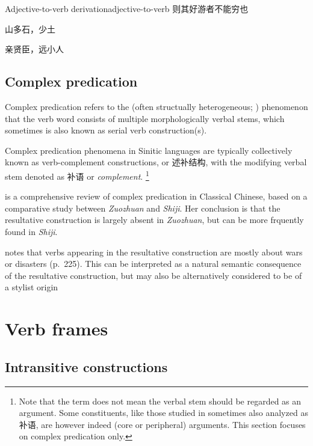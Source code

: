 \documentclass[UTF8, a4paper, oneside, scheme=plain, 12pt]{ctexrep}
\newcommand*{\citepage}[1]{p.~{#1}}
\newcommand*{\citepages}[1]{pp.~{#1}}
\newcommand*{\term}[1]{\emph{#1}}
\newcommand{\work}[1]{\textit{#1}}
\begin{document}
\begin{todobox}{Adjective-to-verb derivation}{adjective-to-verb}
    则其好游者不能穷也

    山多石，少土

    亲贤臣，远小人
\end{todobox}

\section{Complex predication}\label{sec:verbs.complement}

Complex predication refers to the (often structually heterogeneous; \citealt{paul2008serial}) phenomenon 
that the verb word consists of multiple morphologically verbal stems,
which sometimes is also known as serial verb construction(s).

Complex predication phenomena in Sinitic languages are typically collectively known as verb-complement constructions, or 述补结构,
with the modifying verbal stem denoted as 补语 or \term{complement}.%
\footnote{
    Note that the term does not mean the verbal stem should be regarded as an argument.
    Some constituents, like those studied in \citep[\citepages{126-177}]{he2005shiji} sometimes also analyzed as 补语,
    are however indeed (core or peripheral) arguments.
    This section focuses on complex predication only.
}

\citet[\citepages{212-240}]{he2005shiji} is a comprehensive review of complex predication in Classical Chinese,
based on a comparative study between \work{Zuozhuan} and \work{Shiji}.
Her conclusion is that the resultative construction is largely absent in \work{Zuozhuan},
but can be more frquently found in \work{Shiji}.

\citet{he2005shiji} notes that verbs appearing in the resultative construction are mostly about wars or disasters (\citepage{225}).
This can be interpreted as a natural semantic consequence of the resultative construction,
but may also be alternatively considered to be of a stylist origin

\chapter{Verb frames}



\section{Intransitive constructions}
\end{document}
